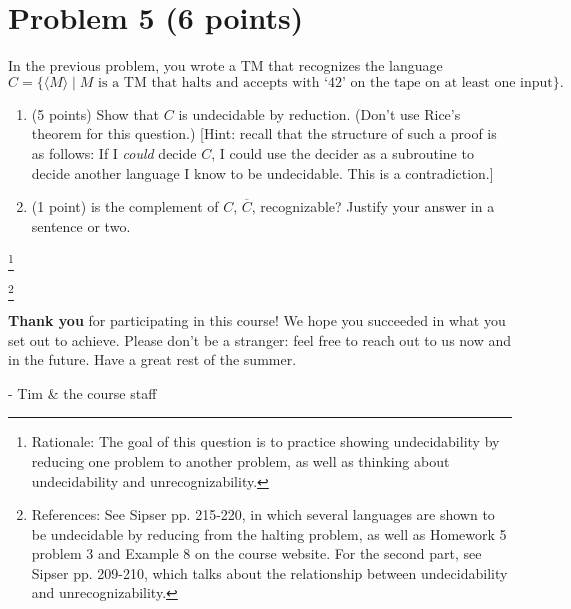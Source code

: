 \documentclass[letterpaper,11pt,twoside]{article}
\theoremstyle{plain}
\theoremstyle{definition}
\theoremstyle{remark}
\theoremstyle{restate}
\newcommand\blfootnote[1]{%
  \begingroup
  \renewcommand\thefootnote{}\footnote{#1}%
  \addtocounter{footnote}{-1}%
  \endgroup
}
\begin{document}
\clearpage
\section{Problem 5 (6 points)}
    In the previous problem, you wrote a TM that recognizes the language
    \[
            C = \{ \langle M \rangle \; | \; M \text{ is a TM that halts and accepts with `42' on the tape on at least one input}\}.
    \]
    \begin{enumerate}
        \item (5 points) Show that $C$ is undecidable by reduction. (Don't use Rice's theorem for this question.) [Hint: recall that the structure of such a proof is as follows: If I \emph{could} decide $C$, I could use the decider as a subroutine to decide another language I know to be undecidable. This is a contradiction.]
        
        \item (1 point) is the complement of $C$, $\overline{C}$, recognizable? Justify your answer in a sentence or two.
    \end{enumerate}
    
    
    
    \blfootnote{ Rationale: The goal of this question is to practice showing undecidability by reducing one problem to another problem, as well as thinking about undecidability and unrecognizability. }
    \blfootnote{ References: See Sipser pp. 215-220, in which several languages are shown to be undecidable by reducing from the halting problem, as well as Homework 5 problem 3 and Example 8 on the course website. For the second part, see Sipser pp. 209-210, which talks about the relationship between undecidability and unrecognizability. }
    
\clearpage

\textbf{Thank you} for participating in this course! We hope you succeeded in what you set out to achieve. Please don't be a stranger: feel free to reach out to us now and in the future. Have a great rest of the summer.

 - Tim \& the course staff
\end{document}
